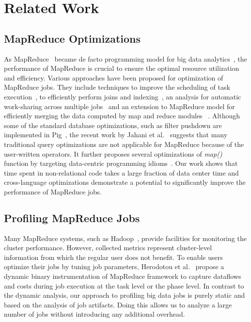 \section{Related Work}

\subsection{MapReduce Optimizations}
As MapReduce~\cite{Dean:2008} became de facto programming model for big data analytics~\cite{Gates:2009}, the performance of MapReduce is crucial to ensure the optimal resource utilization and efficiency. Various approaches have been proposed for optimization of MapReduce jobs. They include techniques to improve the scheduling of task execution~\cite{Isard:2009,Zaharia:2008}, to efficiently perform joins and indexing~\cite{Dittrich:2010,Floratou:2011}, an analysis for automatic work-sharing across multiple jobs~\cite{Nykiel:2010} and an extension to MapReduce model for efficiently merging the data computed by map and reduce modules~\cite{Yang:2007} . Although some of the standard database optimizations, such as filter pushdown are implemented in Pig~\cite{Olston:2008}, the recent work by Jahani et al.~\cite{Jahani:2011} suggests that many traditional query optimizations are not applicable for MapReduce because of the user-written operators. It further proposes several optimizations of \emph{map()} function by targeting data-centric programming idioms~\cite{Jahani:2011}. Our work shows that time spent in non-relational code takes a large fraction of data center time and cross-language optimizations demonstrate a potential to significantly improve the performance of MapReduce jobs.

\subsection{Profiling MapReduce Jobs}
Many MapReduce systems, such as Hadoop~\cite{hadoop_stream}, provide facilities for monitoring the cluster performance. However, collected metrics represent cluster-level information from which the regular user does not benefit. To enable users optimize their jobs by tuning job parameters, Herodotou et al.~\cite{Herodotou} propose a dynamic binary instrumentation of MapReduce framework to capture dataflows and costs during job execution at the task level or the phase level. In contrast to the dynamic analysis, our approach to profiling big data jobs is purely static and based on the analysis of job artifacts. Doing this allows us to analyze a large number of jobs without introducing any additional overhead. 
